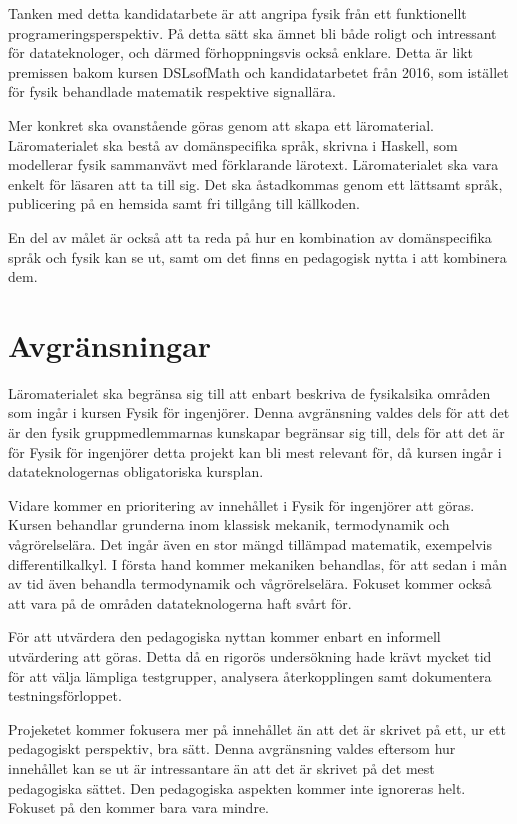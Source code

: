 \begin{draft}

Tanken med detta kandidatarbete är att angripa fysik från ett funktionellt programeringsperspektiv. På detta sätt ska ämnet bli både roligt och intressant för datateknologer, och därmed förhoppningsvis också enklare. Detta är likt premissen bakom kursen DSLsofMath och kandidatarbetet från 2016, som istället för fysik behandlade matematik respektive signallära.

Mer konkret ska ovanstående göras genom att skapa ett läromaterial. Läromaterialet ska bestå av domänspecifika språk, skrivna i Haskell, som modellerar fysik sammanvävt med förklarande lärotext. Läromaterialet ska vara enkelt för läsaren att ta till sig. Det ska åstadkommas genom ett lättsamt språk, publicering på en hemsida samt fri tillgång till källkoden.

En del av målet är också att ta reda på hur en kombination av domänspecifika språk och fysik kan se ut, samt om det finns en pedagogisk nytta i att kombinera dem.

\end{draft}

\section{Avgränsningar}
\label{sec:avgransningar}

\begin{draft}

Läromaterialet ska begränsa sig till att enbart beskriva de fysikalsika områden som ingår i kursen Fysik för ingenjörer. Denna avgränsning valdes dels för att det är den fysik gruppmedlemmarnas kunskapar begränsar sig till, dels för att det är för Fysik för ingenjörer detta projekt kan bli mest relevant för, då kursen ingår i datateknologernas obligatoriska kursplan.

Vidare kommer en prioritering av innehållet i Fysik för ingenjörer att göras. Kursen behandlar grunderna inom klassisk mekanik, termodynamik och vågrörelselära. Det ingår även en stor mängd tillämpad matematik, exempelvis differentilkalkyl. I första hand kommer mekaniken behandlas, för att sedan i mån av tid även behandla termodynamik och vågrörelselära. Fokuset kommer också att vara på de områden datateknologerna haft svårt för.

För att utvärdera den pedagogiska nyttan kommer enbart en informell utvärdering att göras. Detta då en rigorös undersökning hade krävt mycket tid för att välja lämpliga testgrupper, analysera återkopplingen samt dokumentera testningsförloppet.

Projeketet kommer fokusera mer på innehållet än att det är skrivet på ett, ur ett pedagogiskt perspektiv, bra sätt. Denna avgränsning valdes eftersom hur innehållet kan se ut är intressantare än att det är skrivet på det mest pedagogiska sättet. Den pedagogiska aspekten kommer inte ignoreras helt. Fokuset på den kommer bara vara mindre.

\end{draft}



